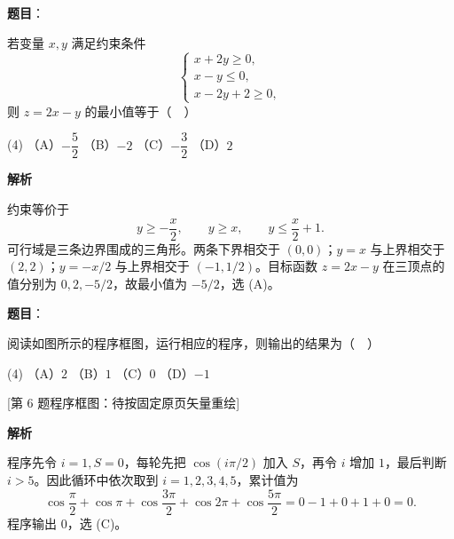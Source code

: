 \begin{answer}

\textbf{题目}：

若变量 $x,y$ 满足约束条件
\nopagebreak[4]
\[
\begin{cases}
x+2y\geqslant0,\\
x-y\leqslant0,\\
x-2y+2\geqslant0,
\end{cases}
\]
则 $z=2x-y$ 的最小值等于（　）

\begin{gkopts}(4)
\task （A）$-\dfrac52$
\task （B）$-2$
\task （C）$-\dfrac32$
\task （D）$2$
\end{gkopts}

\textbf{解析}

约束等价于
\nopagebreak[4]
\[
y\geqslant-\frac{x}{2},\qquad y\geqslant x,\qquad y\leqslant\frac{x}{2}+1.
\]
可行域是三条边界围成的三角形。两条下界相交于 $(0,0)$；$y=x$ 与上界相交于 $(2,2)$；$y=-x/2$ 与上界相交于 $(-1,1/2)$。目标函数 $z=2x-y$ 在三顶点的值分别为 $0,2,-5/2$，故最小值为 $-5/2$，选 (A)。


\end{answer}
\begin{answer}

\textbf{题目}：

阅读如图所示的程序框图，运行相应的程序，则输出的结果为（　）

\begin{gkopts}(4)
\task （A）$2$
\task （B）$1$
\task （C）$0$
\task （D）$-1$
\end{gkopts}

[第 6 题程序框图：待按固定原页矢量重绘]

\textbf{解析}

程序先令 $i=1,S=0$，每轮先把 $\cos(i\pi/2)$ 加入 $S$，再令 $i$ 增加 $1$，最后判断 $i>5$。因此循环中依次取到 $i=1,2,3,4,5$，累计值为
\nopagebreak[4]
\[
\cos\frac{\pi}{2}+\cos\pi+\cos\frac{3\pi}{2}+\cos2\pi+\cos\frac{5\pi}{2}
=0-1+0+1+0=0.
\]
程序输出 $0$，选 (C)。


\end{answer}
